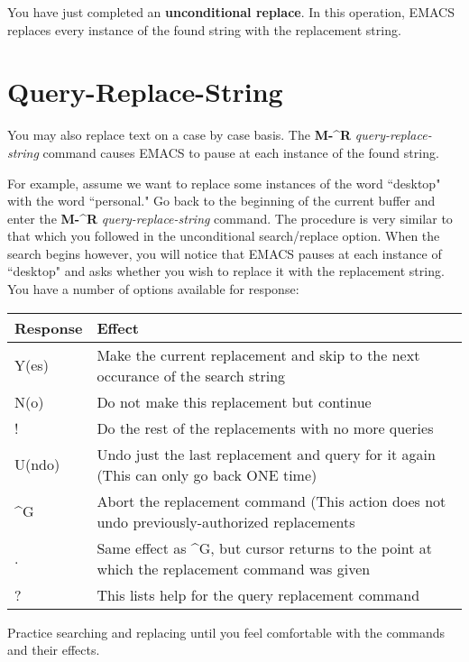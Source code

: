 You have just completed an {\bf{}unconditional replace}.  In this
operation, EMACS replaces every instance of the found string with the
replacement string.

\section{Query-Replace-String}

You may also replace text on a case by case basis.  The {\bf{}M-\^{}R}
{\it{}query-replace-string}  command causes
EMACS to pause at each instance of the found string.

For example, assume we want to replace some instances of the word
``desktop" with the word ``personal." Go back to the beginning of the
current buffer and enter the {\bf{}M-\^{}R} {\it{}query-replace-string}
command.  The procedure is very similar to that
which you followed in the unconditional search/replace option.  When the
search begins however, you will notice that EMACS pauses at each
instance of ``desktop" and asks whether you wish to replace it with
the replacement string.  You have a number of options available for
response:

\begin{tabular}{lp{5.5in}}
Response & Effect\\ \hline
Y(es) &Make the current replacement and skip to the next
occurance of the search string\\

N(o) & Do not make this replacement but continue\\

! & Do the rest of the replacements with no more queries\\

U(ndo) & Undo just the last replacement and query for it
again (This can only go back ONE time)\\

\^{}G & Abort the replacement command (This action does not
undo previously-authorized replacements\\

. & Same effect as \^{}G, but cursor returns to the point at
which the replacement command was given\\

? & This lists help for the query replacement command\\
\end{tabular}

Practice searching and replacing until you feel
comfortable with the commands and their effects.

